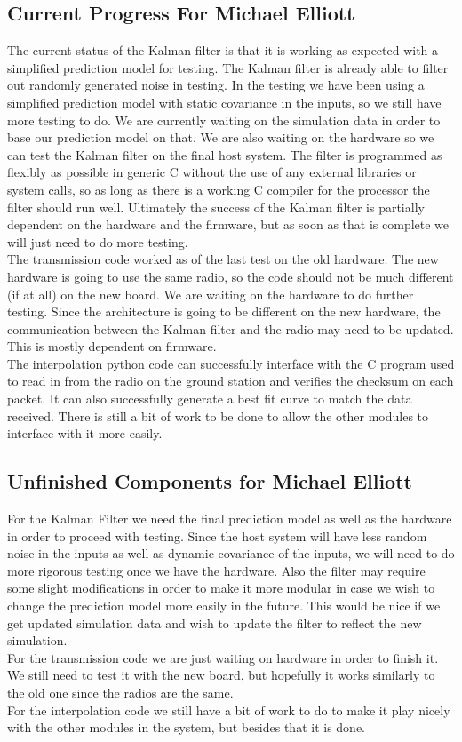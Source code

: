 \documentclass[onecolumn, draftclsnofoot,10pt, compsoc]{IEEEtran}
\begin{document}
\subsection {Current Progress For Michael Elliott} 
The current status of the Kalman filter is that it is working as
expected with a simplified prediction model for testing.
The Kalman filter is already able to filter out randomly generated
noise in testing.
In the testing we have been using a simplified prediction model with
static covariance in the inputs, so we still have more testing to do.
We are currently waiting on the simulation data in order to base our
prediction model on that.
We are also waiting on the hardware so we can test the Kalman filter
on the final host system.
The filter is programmed as flexibly as possible in generic C without
the use of any external libraries or system calls, so as long as there
is a working C compiler for the processor the filter should run well.
Ultimately the success of the Kalman filter is partially dependent on
the hardware and the firmware, but as soon as that is complete we will
just need to do more testing.\\
The transmission code worked as of the last test on the old hardware.
The new hardware is going to use the same radio, so the code should
not be much different (if at all) on the new board.
We are waiting on the hardware to do further testing.
Since the architecture is going to be different on the new hardware,
the communication between the Kalman filter and the radio may need to
be updated.
This is mostly dependent on firmware.\\
The interpolation python code can successfully interface with the C
program used to read in from the radio on the ground station and
verifies the checksum on each packet.
It can also successfully generate a best fit curve to match the data received.
There is still a bit of work to be done to allow the other modules to
interface with it more easily.\\
\subsection {Unfinished Components for Michael Elliott}
For the Kalman Filter we need the final prediction model as well as
the hardware in order to proceed with testing.
Since the host system will have less random noise in the inputs as
well as dynamic covariance of the inputs, we will need to do more
rigorous testing once we have the hardware.
Also the filter may require some slight modifications in order to make
it more modular in case we wish to change the prediction model more
easily in the future.
This would be nice if we get updated simulation data and wish to
update the filter to reflect the new simulation.\\
For the transmission code we are just waiting on hardware in order to finish it.
We still need to test it with the new board, but hopefully it works
similarly to the old one since the radios are the same.\\
For the interpolation code we still have a bit of work to do to make
it play nicely with the other modules in the system, but besides that
it is done. 
\end{document}
